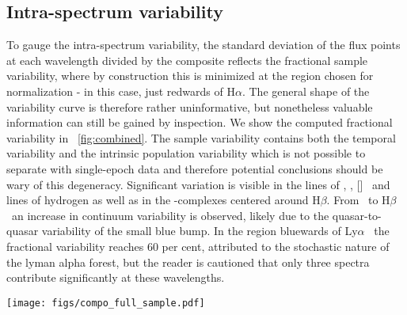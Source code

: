 \documentclass{aa}    %
\newcommand{\figref}[1]{\ref{fig:#1}}
\newcommand{\Fig}[1]{\figurename~\figref{#1}}
\newcommand{\fig}[1]{\Fig{#1}}
\newcommand{\figlabel}[1]{\label{fig:#1}}
\newcommand{\sectionname}{Sect.}
\newcommand{\Sect}[1]{\sectionname~\ref{sect:#1}}
\newcommand{\sect}[1]{\Sect{#1}}
\newcommand{\sectlabel}[1]{\label{sect:#1}}
\newcommand{\lya}{Ly$\alpha$}
\newcommand{\hb}{H$\beta$}
\newcommand{\ha}{H$\alpha$}
\newcommand{\oiii}{[\ion{O}{iii}]}
\newcommand{\feii}{\ion{Fe}{ii}}
\newcommand{\civ}{\ion{C}{iv}}
\newcommand{\mgii}{\ion{Mg}{ii}}
\begin{document}
 \subsection{Intra-spectrum variability}  \sectlabel{variability}
 
 To gauge the intra-spectrum variability, the standard deviation of the flux points at each wavelength divided by the composite reflects the fractional sample variability, where by construction this is minimized at the region chosen for normalization - in this case, just redwards of \ha. The general shape of the variability curve is therefore rather uninformative, but nonetheless valuable information can still be gained by inspection. We show the computed fractional variability in \fig{combined}. The sample variability contains both the temporal variability and the intrinsic population variability which is not possible to separate with single-epoch data and therefore potential conclusions should be wary of this degeneracy.
 Significant variation is visible in the lines of \civ, \mgii, \oiii~ and lines of hydrogen as well as in the \feii-complexes centered around \hb. From \civ~to \hb~an increase in continuum variability is observed, likely due to the quasar-to-quasar variability of the small blue bump. In the region bluewards of \lya~ the fractional variability reaches 60 per cent, attributed to the stochastic nature of the lyman alpha forest, but the reader is cautioned that only three spectra contribute significantly at these wavelengths.  
  
\begin{figure*}[t!]
\centering
\texttt{[image: figs/compo\_full\_sample.pdf]}
\caption[]{X-shooter weighted arithmetic quasar composite on a linear wavelength scale. The position of several prominent emission lines are marked. Overplotted is the corresponding composite generated from the full sample of SDSS quasars fulfilling the selection criteria and general agreement is observed, albeit with a brighter balmer continuum in the SDSS-constructed composite. In red and green is shown the results from fitting both a pure and a broken power-law to the regions specified in \sect{results} and they are observed to be consistent.}
\figlabel{composite}
\end{figure*}
\end{document}
